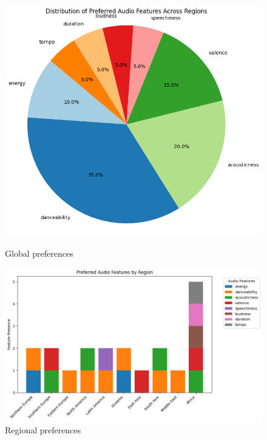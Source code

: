 \begin{figure}[H]
    \centering
    \begin{minipage}{0.45\textwidth}
        \centering
        \includegraphics[width=\textwidth]{media/features_preferences.png}  
        \caption{Global preferences}
    \end{minipage}
    \hfill
    \begin{minipage}{0.54\textwidth}
        \centering
        \includegraphics[width=\textwidth]{media/feature_preferences_regions.png}  
        \caption{Regional preferences}
    \end{minipage}
\end{figure}

